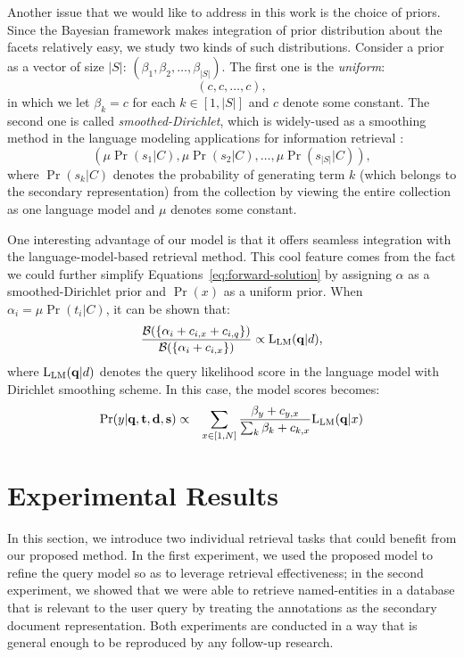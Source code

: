 Another issue that we would like to address in this work is the choice of
priors.  Since the Bayesian framework makes integration of prior distribution
about the facets relatively easy, we study two kinds of such distributions.
Consider a prior as a vector of size $|S|$: $(\beta_1, \beta_2, \ldots,
\beta_{|S|})$.  The first one is the \emph{uniform}: \[ (c, c, \ldots, c), \]
in which we let $\beta_k = c$ for each $k \in [1, |S|]$ and $c$ denote some
constant.  The second one is called \emph{smoothed-Dirichlet}, which is
widely-used as a smoothing method in the language modeling applications for
information retrieval \cite{zhai2004study}: \[ (\mu \Pr(s_1|C), \mu \Pr(s_2|C),
\ldots, \mu \Pr(s_{|S|}|C)), \] where $\Pr(s_k|C)$ denotes the probability of
generating term $k$ (which belongs to the secondary representation) from the collection by viewing the entire collection as
one language model and $\mu$ denotes some constant.

One interesting advantage of our model is that it offers seamless integration
with the language-model-based retrieval method.  This cool feature comes from
the fact we could further simplify Equations~\eqref{eq:forward-solution} by
assigning $\alpha$ as a smoothed-Dirichlet prior and $\Pr(x)$ as a uniform
prior.  When $\alpha_i = \mu \Pr(t_i|C)$, it can be shown that: \[
\frac{\mathcal{B}(\{\alpha_i + c_{i,x} + c_{i,q} \})}{\mathcal{B}(\{\alpha_i +
c_{i,x} \})} \propto {\rm L}_{\rm LM}(\mathbf{q}|d), \] where ${\rm L}_{\rm
LM}(\mathbf{q}|d)$ denotes the query likelihood score in the language model
with Dirichlet smoothing scheme.  In this case, the model scores becomes:
\begin{eqnarray*}
  \Pr(y|\mathbf{q}, \mathbf{t}, \mathbf{d}, \mathbf{s}) &\propto& 
  \sum_{x \in [1, N]} \frac{\beta_y + c_{y,x}}{\sum_k \beta_k + c_{k,x}}
  {\rm L}_{\rm LM}(\mathbf{q}|x) \nonumber\\
\end{eqnarray*} 

\section{Experimental Results}\label{s:experimental-results}

In this section, we introduce two individual retrieval tasks that could benefit
from our proposed method.  In the first experiment, we used the proposed model
to refine the query model so as to leverage retrieval effectiveness; in the
second experiment, we showed that we were able to retrieve named-entities in a
database that is relevant to the user query by treating the annotations as the
secondary document representation.  Both experiments are conducted in a way
that is general enough to be reproduced by any follow-up research.


